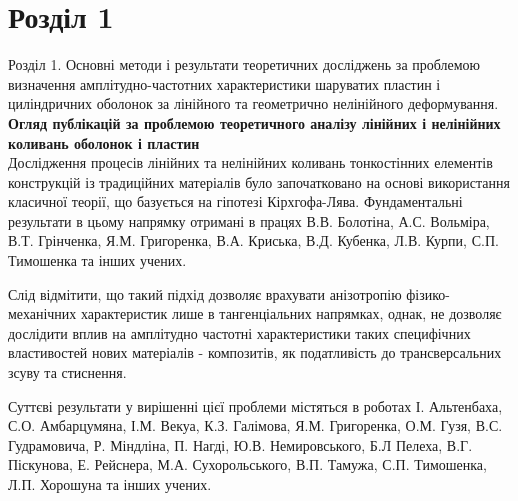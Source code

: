 \documentclass[8pt]{beamer}
\numberwithin{figure}{section}
\numberwithin{equation}{section}
\begin{document}
\section{Розділ 1}

\begin{frame}{Розділ 1. Основні методи і результати теоретичних досліджень за проблемою визначення  амплітудно-частотних характеристики шаруватих пластин і циліндричних оболонок за лінійного та геометрично нелінійного деформування.}
\textbf{Огляд публікацій за проблемою теоретичного аналізу лінійних і нелінійних коливань оболонок і пластин}\\[3mm]
\indent Дослідження процесів лінійних та нелінійних коливань тонкостінних елементів конструкцій із традиційних матеріалів було започатковано на основі використання класичної теорії, що базується на гіпотезі Кірхгофа-Лява. Фундаментальні результати в цьому напрямку отримані в працях  В.В. Болотіна, А.С. Вольміра, В.Т. Грінченка, Я.М. Григоренка, В.А. Криська, В.Д. Кубенка, Л.В. Курпи, С.П. Тимошенка та інших учених. 

\medskip 
Слід відмітити, що такий підхід дозволяє врахувати анізотропію фізико-механічних характеристик лише в тангенціальних напрямках, однак, не дозволяє дослідити вплив на амплітудно частотні характеристики  таких специфічних властивостей нових матеріалів - композитів, як податливість до трансверсальних зсуву та стиснення.

\medskip Суттєві результати у вирішенні цієї проблеми містяться в роботах І. Альтенбаха, С.О. Амбарцумяна, І.М. Векуа, К.З. Галімова, Я.М. Григоренка, О.М. Гузя, В.С. Гудрамовича, Р. Міндліна, П. Нагді, Ю.В. Немировського, Б.Л Пелеха, В.Г. Піскунова, Е. Рейснера, М.А. Сухорольського, В.П. Тамужа, С.П. Тимошенка, Л.П. Хорошуна та інших учених.
\end{frame}
\end{document}
